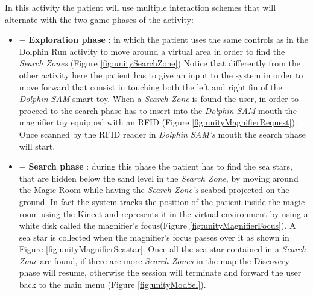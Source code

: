 In this activity the patient will use multiple interaction schemes that will alternate with the two game phases of the activity:
\begin{itemize}
	\item {$ - $} \textbf{Exploration phase} : in which the patient uses the same controls as in the Dolphin Run activity to move around a virtual area in order to find the \textit{Search Zones} (Figure \ref{fig:unitySearchZone}) Notice that differently from the other activity here the patient has to give an input to the system in order to move forward that consist in touching both the left and right fin of the \textit{Dolphin SAM} smart toy. 
	When a \textit{Search Zone} is found the user, in order to proceed to the search phase has to insert into the \textit{Dolphin SAM} mouth the magnifier toy equipped with an RFID (Figure \ref{fig:unityMagnifierRequest}).
	Once scanned by the RFID reader in \textit{Dolphin SAM's} mouth the search phase will start.
	\item {$ - $} \textbf{Search phase} : during this phase the patient has to find the sea stars, that are hidden below the sand level in the \textit{Search Zone}, by moving around the Magic Room while having the \textit{Search Zone's} seabed projected on the ground. In fact the system tracks the position of the patient inside the magic room using the Kinect and represents it in the virtual environment by using a white disk called the magnifier's focus(Figure \ref{fig:unityMagnifierFocus}).
	A sea star is collected when the magnifier's focus passes over it as shown in Figure \ref{fig:unityMagnifierSeastar}. Once all the sea star contained in a \textit{Search Zone} are found, if there are more \textit{Search Zones} in the map the Discovery phase will resume, otherwise the session will terminate and forward the user back to the main menu (Figure \ref{fig:unityModSel}).
\end{itemize}


